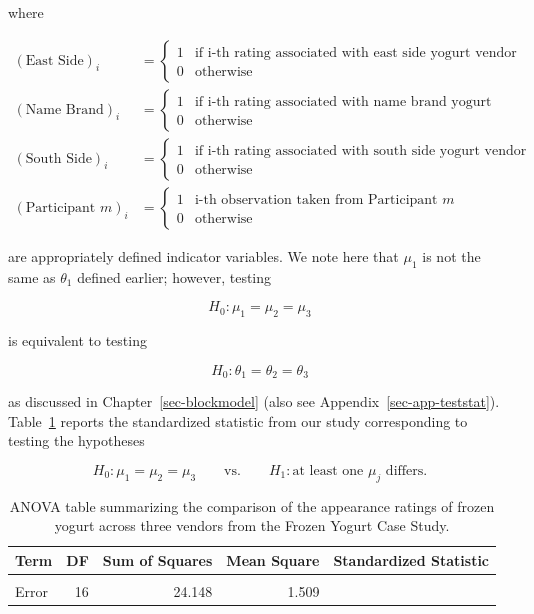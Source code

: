 \documentclass[
  letterpaper,
  DIV=11,
  numbers=noendperiod]{scrreprt}
\theoremstyle{definition}
\theoremstyle{definition}
\theoremstyle{plain}
\theoremstyle{remark}
\begin{document}
where

\[
\begin{aligned}
  (\text{East Side})_i &= \begin{cases}
    1 & \text{if i-th rating associated with east side yogurt vendor} \\
    0 & \text{otherwise}
    \end{cases} \\
  (\text{Name Brand})_i &= \begin{cases}
    1 & \text{if i-th rating associated with name brand yogurt vendor} \\
    0 & \text{otherwise}
    \end{cases} \\
  (\text{South Side})_i &= \begin{cases}
    1 & \text{if i-th rating associated with south side yogurt vendor} \\
    0 & \text{otherwise}
    \end{cases} \\
  (\text{Participant } m)_i &= \begin{cases}
    1 & \text{i-th observation taken from Participant } m \\
    0 & \text{otherwise}
    \end{cases}
\end{aligned}
\]

are appropriately defined indicator variables. We note here that
\(\mu_1\) is not the same as \(\theta_1\) defined earlier; however,
testing

\[H_0: \mu_1 = \mu_2 = \mu_3\]

is equivalent to testing

\[H_0: \theta_1 = \theta_2 = \theta_3\]

as discussed in Chapter~\ref{sec-blockmodel} (also see
Appendix~\ref{sec-app-teststat}). Table~\ref{tbl-blockrecap-anova-table}
reports the standardized statistic from our study corresponding to
testing the hypotheses

\[H_0: \mu_1 = \mu_2 = \mu_3 \qquad \text{vs.} \qquad H_1: \text{at least one } \mu_j \text{ differs.}\]

\hypertarget{tbl-blockrecap-anova-table}{}
\begin{table}
\caption{\label{tbl-blockrecap-anova-table}ANOVA table summarizing the comparison of the appearance ratings of
frozen yogurt across three vendors from the Frozen Yogurt Case Study. }\tabularnewline

\centering
\begin{tabular}[t]{lrrrr}
\toprule
Term & DF & Sum of Squares & Mean Square & Standardized Statistic\\
\midrule
\cellcolor{gray!6}{Vendor} & \cellcolor{gray!6}{2} & \cellcolor{gray!6}{3.185} & \cellcolor{gray!6}{1.593} & \cellcolor{gray!6}{1.055}\\
Error & 16 & 24.148 & 1.509 & \\
\bottomrule
\end{tabular}
\end{table}
\end{document}
